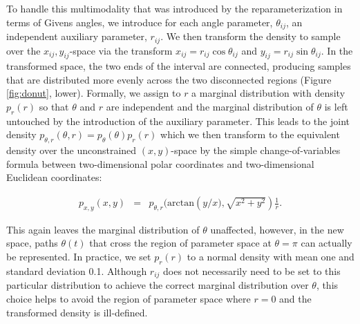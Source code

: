 \documentclass[ba]{imsart}
\numberwithin{equation}{section}
\theoremstyle{plain}
\begin{document}
\noindent To handle this multimodality that was introduced by the reparameterization in terms of Givens angles, we introduce for each angle parameter, $\theta_{ij}$, an independent auxiliary parameter, $r_{ij}$. We then transform the density to sample over the $x_{ij},y_{ij}$-space via the transform $x_{ij} = r_{ij} \cos \theta_{ij}$ and $y_{ij} = r_{ij} \sin \theta_{ij}$. In the transformed space, the two ends of the interval are connected, producing samples that are distributed more evenly across the two disconnected regions (Figure \ref{fig:donut}, lower). Formally, we assign to $r$ a marginal distribution with density $p_r(r)$ so that $\theta$ and $r$ are independent and the marginal distribution of $\theta$ is left untouched by the introduction of the auxiliary parameter. This leads to the joint density $p_{\theta, r}(\theta, r) = p_\theta(\theta) p_r(r)$ which we then transform to the equivalent density over the unconstrained $(x,y)$-space by the simple change-of-variables formula between two-dimensional polar coordinates and two-dimensional Euclidean coordinates:

\begin{eqnarray}
p_{x, y}(x,y) &=& p_{\theta, r}(\mathrm{arctan} \left(y/x), \sqrt{x^2 + y^2} \right) \frac{1}{r}.
\end{eqnarray}

\noindent This again leaves the marginal distribution of $\theta$ unaffected, however, in the new space, paths $\theta(t)$ that cross the region of parameter space at $\theta = \pi$ can actually be represented. In practice, we set  $p_r(r)$ to a normal density with mean one and standard deviation 0.1. Although $r_{ij}$ does not necessarily need to be set to this particular distribution to achieve the correct marginal distribution over $\theta$, this choice helps to avoid the region of parameter space where $r = 0$ and the transformed density is ill-defined.

\end{document}
